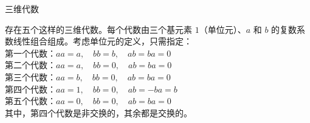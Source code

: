 三维代数

存在五个这样的三维代数。每个代数由三个基元素 $1$（单位元）、$a$ 和 $b$ 的复数系数线性组合组成。考虑单位元的定义，只需指定：\\
第一个代数：$a a = a, \quad b b = b, \quad a b = b a = 0$\\
第二个代数：$a a = a, \quad b b = 0, \quad a b = b a = 0$\\
第三个代数：$a a = b, \quad b b = 0, \quad a b = b a = 0$\\
第四个代数：$a a = 1, \quad b b = 0, \quad a b = - b a = b$\\
第五个代数：$a a = 0, \quad b b = 0, \quad a b = b a = 0$\\
其中，第四个代数是非交换的，其余都是交换的。
